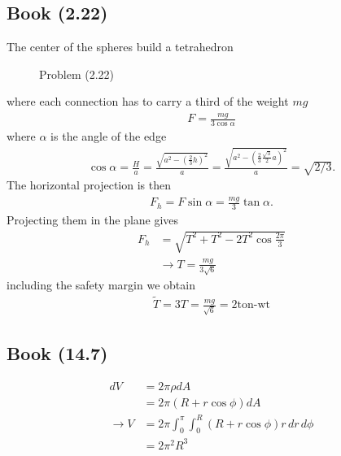 \documentclass[../main.tex]{subfiles}
\begin{document}
\subsection{Book (2.22)}
The center of the spheres build a tetrahedron
\begin{figure}[!h]
\centering
{}
\caption{Problem (2.22)}
\end{figure}
where each connection has to carry a third of the weight $mg$
\begin{align}
F=\frac{mg}{3\cos\alpha}
\end{align}
where $\alpha$ is the angle of the edge
\begin{align}
\cos\alpha=\frac{H}{a}=\frac{\sqrt{a^2-\left(\frac{2}{3}h\right)^2}}{a}=\frac{\sqrt{a^2-\left(\frac{2}{3}\frac{\sqrt{3}}{2}a\right)^2}}{a}=\sqrt{2/3}.
\end{align}
The horizontal projection is then
\begin{align}
F_h=F\sin\alpha=\frac{mg}{3}\tan\alpha.
\end{align}
Projecting them in the plane gives
\begin{align}
F_h&=\sqrt{T^2+T^2-2T^2\cos\frac{2\pi}{3}}\\
&\rightarrow T=\frac{mg}{3\sqrt{6}}
\end{align}
including the safety margin we obtain
\begin{align}
\widetilde{T}=3T=\frac{mg}{\sqrt{6}}=2\text{ton-wt}
\end{align}

\subsection{Book (14.7)}
\begin{align}
dV&=2\pi \rho dA\\
&=2\pi (R+r\cos\phi) dA\\
\rightarrow V&=2\pi\int_0^\pi\int_0^R(R+r\cos\phi)r\,dr\,d\phi\\
&=2\pi^2R^3
\end{align}
\end{document}

